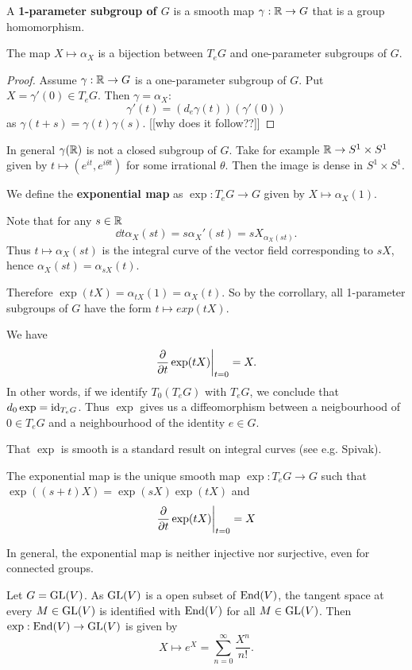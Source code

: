 \documentclass[11pt, english]{article}
\begin{document}
A \textbf{1-parameter subgroup of $G$} is a smooth map $\gamma:\mathbb{R} \to G$ that is a group homomorphism.

\begin{corr}
 The map $X \mapsto \alpha_X$ is a bijection between $T_eG$ and one-parameter subgroups of $G$.
\end{corr}
\begin{proof}
 Assume $\gamma:\mathbb{R} \to G$ is a one-parameter subgroup of $G$. Put $X = \gamma'(0) \in T_eG$. Then $\gamma = \alpha_X$:
$$
\gamma'(t) = (d_e \gamma(t))(\gamma'(0))
$$
as $\gamma(t+s)=\gamma(t)\gamma(s)$. [[why does it follow??]]
\end{proof}

\begin{remark}
 In general $\gamma(\mathbb{R})$ is not a closed subgroup of $G$. Take for example $\mathbb{R} \to S^1 \times S^1$ given by $t \mapsto (e^{it},e^{i\theta t})$ for some irrational $\theta$. Then the image is dense in $S^1 \times S^1$.
\end{remark}

We define the \textbf{exponential map} as $\exp:T_e G \to G$ given by $X \mapsto \alpha_X(1)$. 

Note that for any $s \in \mathbb{R}$
$$
\dd{}{t} \alpha_X (st) = s \alpha_X'(st) = s X_{\alpha_X(st)}.
$$
Thus $t \mapsto \alpha_X(st)$ is the integral curve of the vector field corresponding to $sX$, hence $\alpha_X(st)= \alpha_{sX}(t)$. 

Therefore $\exp(tX)=\alpha_{tX}(1) = \alpha_X(t)$. So by the corrollary, all 1-parameter subgroups of $G$ have the form $t \mapsto exp(tX)$. 

We have
$$
\restr{\dd{}{t} \exp(tX)}{t=0} = X.
$$
In other words, if we identify $T_0(T_eG)$ with $T_eG$, we conclude that $d_0 \exp = \text{id}_{T_eG}$. Thus $\exp$ gives us a diffeomorphism between a neigbourhood of $0 \in T_eG$ and a neighbourhood of the identity $e \in G$.

That $\exp$ is smooth is a standard result on integral curves (see e.g. Spivak).

\begin{thm}
  The exponential map is the unique smooth map $\exp:T_eG \to G$ such that $\exp((s+t)X) = \exp(sX)\exp(tX)$ and
$$
\restr{\dd{}{t} \exp(tX)}{t=0}=X
$$
\end{thm}
In general, the exponential map is neither injective nor surjective, even for connected groups.
\begin{example}
Let $G = \operatorname{GL}(V)$. As $\operatorname{GL}(V)$ is a open subset of $\operatorname{End}(V)$, the tangent space at every $M \in \operatorname{GL}(V)$ is identified with $\operatorname{End}(V)$ for all $M \in \operatorname{GL}(V)$. Then $\exp:\operatorname{End}(V) \to \operatorname{GL}(V)$ is given by 
$$
X \mapsto e^X = \sum_{n=0}^\infty \frac{X^n}{n!}.
$$
\end{example}
\end{document}
